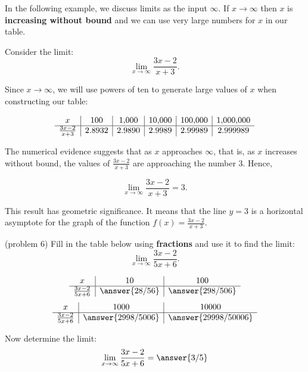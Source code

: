 \documentclass[handout]{ximera}
\begin{document}
In the following example, we discuss limits as the input $\infty$.
If $x \to \infty$ then $x$ is \textbf{increasing without bound} and we can use very large numbers for $x$ in our table.

\begin{example}[example 6]
Consider the limit:
\[\lim_{x \to \infty} \frac{3x -2}{x + 3}. \]

Since $x \to \infty$, we will use powers of ten to generate large values of $x$ when constructing 
our table: 

\[
\begin{array}{ c | c | c | c | c|c}
  x & 100 & 1{,}000 & 10{,}000 & 100{,}000 & 1{,}000{,}000\\ 
	\hline
	 \frac{3x-2}{x+3} & 2.8932 & 2.9890 & 2.9989 & 2.99989 & 2.999989
	\end{array}
\] 

The numerical evidence suggests that as $x$ approaches $\infty$, that is, 
as $x$ increases without bound, the values of $\frac{3x -2}{x +3}$ are approaching the number $3$. Hence,



\[\lim_{x \to \infty} \frac{3x -2}{x +3} = 3. \]

This result has geometric significance.  It means that the line $y = 3$ is a horizontal 
asymptote for the graph of the function $f(x) = \frac{3x -2}{x +3}.$
\end{example}


\begin{problem}(problem 6)
Fill in the table below using \textbf{fractions} and use it to find the limit:
\[\lim_{x \to \infty} \frac{3x-2}{5x+6}.\]

\begin{center}
\[
\begin{array}{ c | c | c }
  x & 10 & 100   \\ 
	\hline 
	 \frac{3x-2}{5x+6} & \answer{28/56} & \answer{298/506} 
\end{array}
\]
\[
\begin{array}{ c | c | c  }
  x  & 1000 & 10000 \\ 
	\hline 
	 \frac{3x-2}{5x+6}  & \answer{2998/5006} & \answer{29998/50006}
\end{array}
\]
\end{center}
Now determine the limit:
\[
\lim_{x \to \infty} \frac{3x-2}{5x+6} = \answer{3/5}
\]
\end{problem}
\end{document}
